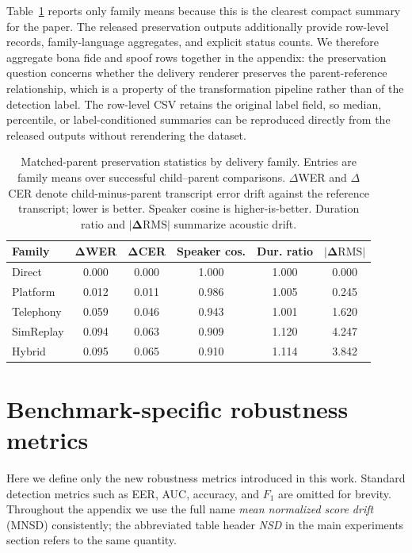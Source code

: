 Table~\ref{tab:appendix_parent_child_drift} reports only family means because this is the clearest compact summary for the paper. The released preservation outputs additionally provide row-level records, family-language aggregates, and explicit status counts. We therefore aggregate bona fide and spoof rows together in the appendix: the preservation question concerns whether the delivery renderer preserves the parent-reference relationship, which is a property of the transformation pipeline rather than of the detection label. The row-level CSV retains the original label field, so median, percentile, or label-conditioned summaries can be reproduced directly from the released outputs without rerendering the dataset.

\begin{table}[t]
\centering
\footnotesize
\setlength{\tabcolsep}{4pt}
\renewcommand{\arraystretch}{1.02}
\caption{Matched-parent preservation statistics by delivery family. Entries are family means over successful child--parent comparisons. $\Delta$WER and $\Delta$CER denote child-minus-parent transcript error drift against the reference transcript; lower is better. Speaker cosine is higher-is-better. Duration ratio and $|\bm{\Delta\mathrm{RMS}}|$ summarize acoustic drift.}
\label{tab:appendix_parent_child_drift}
\begin{tabular*}{0.96\linewidth}{@{\extracolsep{\fill}}lccccc@{}}
\toprule
\textbf{Family} & \textbf{$\bm{\Delta}$WER} & \textbf{$\bm{\Delta}$CER} & \textbf{Speaker cos.} & \textbf{Dur. ratio} & \textbf{$\bm{|\Delta\mathrm{RMS}|}$} \\
\midrule
Direct    & 0.000 & 0.000 & 1.000 & 1.000 & 0.000 \\
Platform  & 0.012 & 0.011 & 0.986 & 1.005 & 0.245 \\
Telephony & 0.059 & 0.046 & 0.943 & 1.001 & 1.620 \\
SimReplay & 0.094 & 0.063 & 0.909 & 1.120 & 4.247 \\
Hybrid    & 0.095 & 0.065 & 0.910 & 1.114 & 3.842 \\
\bottomrule
\end{tabular*}
\end{table}

\section{Benchmark-specific robustness metrics}
\label{app:robust_metrics}

Here we define only the new robustness metrics introduced in this work. Standard detection metrics such as EER, AUC, accuracy, and $F_1$ are omitted for brevity. Throughout the appendix we use the full name \emph{mean normalized score drift} (MNSD) consistently; the abbreviated table header \emph{NSD} in the main experiments section refers to the same quantity.

